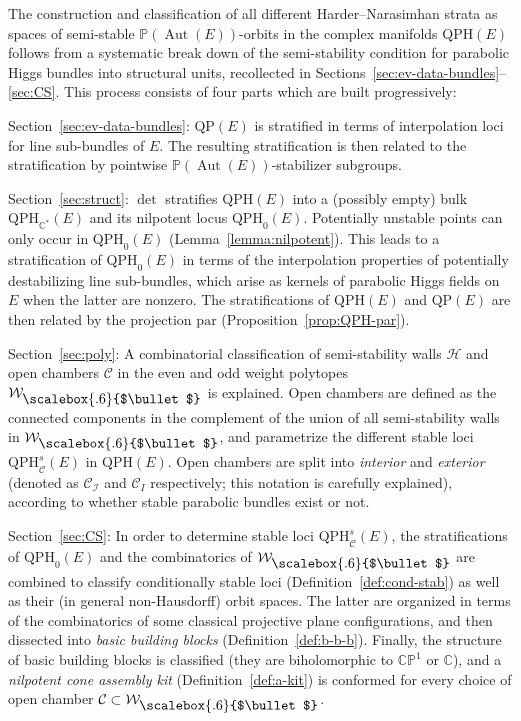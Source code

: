 \documentclass[pdftex]{sigma}
\newcommand{\field}[1]{\ensuremath{\mathbb{#1}}}
\newcommand{\CC}{\field{C}}
\newcommand{\PP}{\field{P}}
\newcommand\sbul[1][.6]{\mathbin{\vcenter{\hbox{\scalebox{#1}{$\bullet$}}}}}
\newcommand{\qC}{\mathcal{C}}
\newcommand{\qH}{\mathcal{H}}
\newcommand{\qI}{\mathcal{I}}
\newcommand{\qW}{\mathcal{W}}
\DeclareMathOperator{\Aut}{Aut}
\numberwithin{equation}{section}
\begin{document}
The construction and classification of all different Harder--Narasimhan strata as spaces of semi-stable $\PP(\Aut(E))$-orbits in the complex manifolds $\mathrm{QPH}(E)$ follows from a systematic break down of the semi-stability condition for parabolic Higgs bundles into structural units, recollected in Sections~\ref{sec:ev-data-bundles}--\ref{sec:CS}. This process consists of four parts which are built progressively:

Section~\ref{sec:ev-data-bundles}:
$\mathrm{QP}(E)$ is stratified in terms of interpolation loci for line sub-bundles of $E$. The resulting stratification is then related to the stratification by pointwise $\PP(\Aut(E))$-stabilizer subgroups.

Section~\ref{sec:struct}:
$\det$ stratifies $\mathrm{QPH}(E)$ into a (possibly empty) bulk $\mathrm{QPH}_{\CC^{*}}(E)$ and its nilpotent locus $\mathrm{QPH}_{0}(E)$. Potentially unstable points can only occur in $\mathrm{QPH}_{0}(E)$ (Lemma~\ref{lemma:nilpotent}). This leads to a stratification of $\mathrm{QPH}_{0}(E)$ in terms of the interpolation properties of potentially destabilizing line sub-bundles, which arise as kernels of parabolic Higgs fields on $E$ when the latter are nonzero. The stratifications of $\mathrm{QPH}(E)$ and $\mathrm{QP}(E)$ are then related by the projection $\mathrm{par}$ (Proposition~\ref{prop:QPH-par}).

Section~\ref{sec:poly}:
A combinatorial classification of semi-stability walls $\qH$ and open chambers $\qC$ in the even and odd weight polytopes $\qW_{\sbul}$ is explained. Open chambers are defined as the connected components in the complement of the union of all semi-stability walls in $\qW_{\sbul}$, and parametrize the different stable loci $\mathrm{QPH}^{s}_{\qC}(E)$ in $\mathrm{QPH}(E)$. Open chambers are split into \textit{interior} and \textit{exterior} (denoted as $\qC_{\qI}$ and $\qC_{I}$ respectively; this notation is carefully explained), according to whether stable parabolic bundles exist or not.

Section~\ref{sec:CS}: In order to determine stable loci $\mathrm{QPH}^{s}_{\qC}(E)$, the stratifications of $\mathrm{QPH}_{0}(E)$ and the combinatorics of $\qW_{\sbul}$ are combined to classify conditionally stable loci (Definition~\ref{def:cond-stab}) as well as their (in general non-Hausdorff) orbit spaces. The latter are organized in terms of the combinatorics of some classical projective plane configurations, and then dissected into \textit{basic building blocks} (Definition~\ref{def:b-b-b}). Finally, the structure of basic building blocks is classified (they are biholomorphic to $\CC\PP^{1}$ or $\CC$), and a \textit{nilpotent cone assembly kit} (Definition~\ref{def:a-kit}) is conformed for every choice of open chamber $\qC\subset \qW_{\sbul}$.
\end{document}
